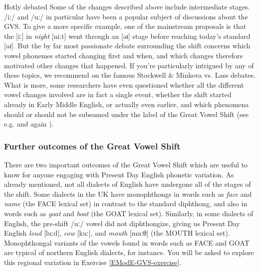 \begin{soundbox}{Hotly debated}
Some of the changes described above include intermediate stages. /iː/ and /uː/ in particular have been a popular subject of discussions about the GVS. To give a more specific example, one of the mainstream proposals is that the [iː] in \textit{night} [niːt] went through an [əɪ] stage before reaching today's standard [aɪ]. But the by far most passionate debate surrounding the shift concerns which vowel phonemes started changing first and when, and which changes therefore motivated other changes that happened. If you're particularly intrigued by any of these topics, we recommend \citet{McMahon2006} on the famous Stockwell \& Minkova vs. Lass debates.  What is more, some researchers have even questioned whether all the different vowel changes involved are in fact a single event, whether the shift started already in Early Middle English, or actually even earlier, and which phenomena should or should not be subsumed under the label of the Great Vowel Shift (see e.g. \citealp[chapter 1]{Stenbrenden2016} and again \citealp{McMahon2006}).
\end{soundbox}


\subsubsection{Further outcomes of the Great Vowel Shift}
There are two important outcomes of the Great Vowel Shift which are useful to know for anyone engaging with Present Day English phonetic variation. As already mentioned, not all dialects of English have undergone all of the stages of the shift. Some dialects in the UK have monophthongs in words such as \textit{face} and \textit{name} (the FACE lexical set) in contrast to the standard diphthong, and also in words such as \textit{goat} and \textit{boat} (the GOAT lexical set). Similarly, in some dialects of English, the pre-shift /uː/ vowel did not diphthongize, giving us Present Day English \textit{loud} [luːd], \textit{cow} [kuː], and \textit{mouth} [muːθ] (the MOUTH lexical set). Monophthongal variants of the vowels found in words such as FACE and GOAT are typical of northern English dialects, for instance. You will be asked to explore this regional variation in Exercise \ref{EModE-GVS-exercise}. 


